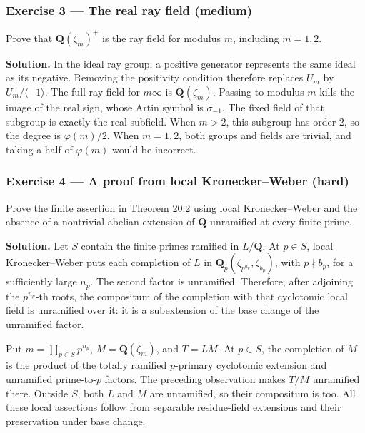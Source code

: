 \documentclass[11pt,a4paper]{article}
\begin{document}
\subsubsection{Exercise 3 --- The real ray field
(medium)}\label{exercise-3-the-real-ray-field-medium}

Prove that \(\mathbf Q(\zeta_m)^+\) is the ray field for modulus \(m\),
including \(m=1,2\).

\textbf{Solution.} In the ideal ray group, a positive generator
represents the same ideal as its negative. Removing the positivity
condition therefore replaces \(U_m\) by \(U_m/\langle-1\rangle\). The
full ray field for \(m\infty\) is \(\mathbf Q(\zeta_m)\). Passing to
modulus \(m\) kills the image of the real sign, whose Artin symbol is
\(\sigma_{-1}\). The fixed field of that subgroup is exactly the real
subfield. When \(m>2\), this subgroup has order \(2\), so the degree is
\(\varphi(m)/2\). When \(m=1,2\), both groups and fields are trivial,
and taking a half of \(\varphi(m)\) would be incorrect.

\subsubsection{Exercise 4 --- A proof from local Kronecker--Weber
(hard)}\label{exercise-4-a-proof-from-local-kroneckerweber-hard}

Prove the finite assertion in Theorem 20.2 using local Kronecker--Weber
and the absence of a nontrivial abelian extension of \(\mathbf Q\)
unramified at every finite prime.

\textbf{Solution.} Let \(S\) contain the finite primes ramified in
\(L/\mathbf Q\). At \(p\in S\), local Kronecker--Weber puts each
completion of \(L\) in \(\mathbf Q_p(\zeta_{p^{n_p}},\zeta_{b_p})\),
with \(p\nmid b_p\), for a sufficiently large \(n_p\). The second factor
is unramified. Therefore, after adjoining the \(p^{n_p}\)-th roots, the
compositum of the completion with that cyclotomic local field is
unramified over it: it is a subextension of the base change of the
unramified factor.

Put \(m=\prod_{p\in S}p^{n_p}\), \(M=\mathbf Q(\zeta_m)\), and \(T=LM\).
At \(p\in S\), the completion of \(M\) is the product of the totally
ramified \(p\)-primary cyclotomic extension and unramified
prime-to-\(p\) factors. The preceding observation makes \(T/M\)
unramified there. Outside \(S\), both \(L\) and \(M\) are unramified, so
their compositum is too. All these local assertions follow from
separable residue-field extensions and their preservation under base
change.
\end{document}
